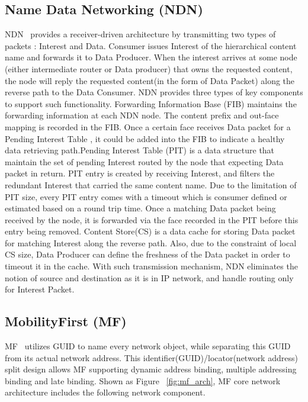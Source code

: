 \subsection{Name Data Networking (NDN)}
NDN~\cite{zhang2014named} provides a receiver-driven architecture by transmitting two types of packets : Interest and Data. Consumer issues Interest of the hierarchical content name and forwards it to Data Producer. When the interest arrives at some node (either intermediate router or Data producer) that owns the requested content, the node will reply the requested content(in the form of Data Packet) along the reverse path to the Data Consumer. NDN provides three types of key components to support such functionality. Forwarding Information Base (FIB) maintains the forwarding information at each NDN node. The content prefix and out-face mapping is recorded in the FIB. Once a certain face receives Data packet for a Pending Interest Table , it could be added into the FIB to indicate a healthy data retrieving path.Pending Interest Table (PIT) is a data structure that maintain the set of pending Interest routed by the node that expecting Data packet in return. PIT entry is created by receiving Interest, and filters the redundant Interest that carried the same content name. Due to the limitation of PIT size, every PIT entry comes with a timeout which is consumer defined or estimated based on a round trip time. Once a matching Data packet being received by the node, it is forwarded via the face recorded in the PIT before this entry being removed. Content Store(CS) is a data cache for storing Data packet for matching Interest along the reverse path. Also, due to the constraint of local CS size, Data Producer can define the freshness of the Data packet in order to timeout it in the cache. With such transmission mechanism, NDN eliminates the notion of source and destination as it is in IP network, and handle routing only for Interest Packet.

\subsection{MobilityFirst (MF)}\label{sec:intro_mf}
MF~\cite{raychaudhuri2012mobilityfirst} utilizes GUID to name every network object, while separating this GUID from its actual network address. This identifier(GUID)/locator(network address) split design allows MF supporting dynamic address binding, multiple addressing binding and late binding. Shown as Figure ~\ref{fig:mf_arch}, MF core network architecture includes the following network component.

